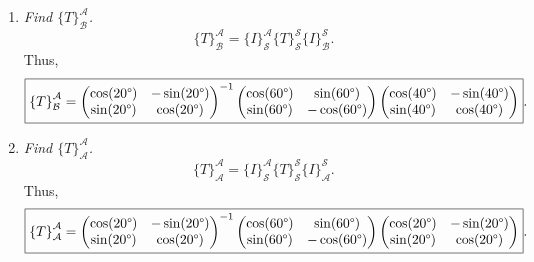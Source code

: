 \documentclass[12pt]{article}
\newcommand{\based}[3]{{\{#1\}}_{#2}^{#3}}
\begin{document}
\begin{enumerate}[label=(\alph*)]
	\item \textit{Find $\based{T}{\mathcal{B}}{\mathcal{A}}$.}
	\begin{equation*}
		\based{T}{\mathcal{B}}{\mathcal{A}}
		=
		\based{I}{\mathcal{S}}{\mathcal{A}}
		\based{T}{\mathcal{S}}{\mathcal{S}}
		\based{I}{\mathcal{B}}{\mathcal{S}}
		.
	\end{equation*}
	Thus,
	\footnotesize
	\begin{equation*}
		\boxed{
			\based{T}{\mathcal{B}}{\mathcal{A}}
			=
			\begin{pmatrix}
				\cos(20 \degree) & -\sin(20 \degree) \\
				\sin(20 \degree) & \cos(20 \degree)
			\end{pmatrix}
			^{-1}
			\begin{pmatrix}
				\cos(60 \degree) & \sin(60 \degree) \\
				\sin(60 \degree) & -\cos(60 \degree)
			\end{pmatrix}
			\begin{pmatrix}
				\cos(40 \degree) & -\sin(40 \degree) \\
				\sin(40 \degree) & \cos(40 \degree)
			\end{pmatrix}
		}
		.
	\end{equation*}
	\normalsize
	
	\item \textit{Find $\based{T}{\mathcal{A}}{\mathcal{A}}$.}
	\begin{equation*}
		\based{T}{\mathcal{A}}{\mathcal{A}}
		=
		\based{I}{\mathcal{S}}{\mathcal{A}}
		\based{T}{\mathcal{S}}{\mathcal{S}}
		\based{I}{\mathcal{A}}{\mathcal{S}}
		.
	\end{equation*}
	Thus,
	\footnotesize
	\begin{equation*}
		\boxed{
			\based{T}{\mathcal{A}}{\mathcal{A}}
			=
			\begin{pmatrix}
				\cos(20 \degree) & -\sin(20 \degree) \\
				\sin(20 \degree) & \cos(20 \degree)
			\end{pmatrix}
			^{-1}
			\begin{pmatrix}
				\cos(60 \degree) & \sin(60 \degree) \\
				\sin(60 \degree) & -\cos(60 \degree)
			\end{pmatrix}
			\begin{pmatrix}
				\cos(20 \degree) & -\sin(20 \degree) \\
				\sin(20 \degree) & \cos(20 \degree)
			\end{pmatrix}
		}
		.
	\end{equation*}
	\normalsize
	

\end{enumerate}
\end{document}
